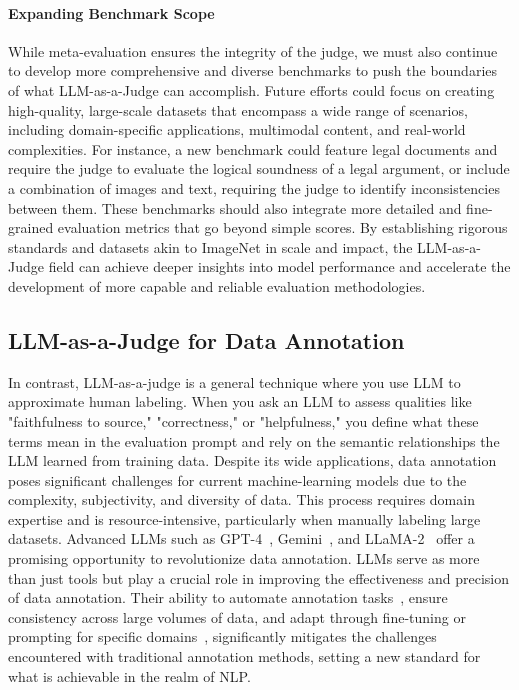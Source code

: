 \documentclass[acmsmall,screen]{acmart}
\begin{document}
\paragraph{\textbf{Expanding Benchmark Scope}}
While meta-evaluation ensures the integrity of the judge, we must also continue to develop more comprehensive and diverse benchmarks to push the boundaries of what LLM-as-a-Judge can accomplish. Future efforts could focus on creating high-quality, large-scale datasets that encompass a wide range of scenarios, including domain-specific applications, multimodal content, and real-world complexities. For instance, a new benchmark could feature legal documents and require the judge to evaluate the logical soundness of a legal argument, or include a combination of images and text, requiring the judge to identify inconsistencies between them. These benchmarks should also integrate more detailed and fine-grained evaluation metrics that go beyond simple scores. By establishing rigorous standards and datasets akin to ImageNet in scale and impact, the LLM-as-a-Judge field can achieve deeper insights into model performance and accelerate the development of more capable and reliable evaluation methodologies.


\subsection{LLM-as-a-Judge for Data Annotation}
{In contrast, LLM-as-a-judge is a general technique where you use LLM to approximate human labeling. When you ask an LLM to assess qualities like "faithfulness to source," "correctness," or "helpfulness," you define what these terms mean in the evaluation prompt and rely on the semantic relationships the LLM learned from training data. }
Despite its wide applications, data annotation poses significant challenges for current machine-learning models due to the complexity, subjectivity, and diversity of data. This process requires domain expertise and is resource-intensive, particularly when manually labeling large datasets. Advanced LLMs such as GPT-4~\cite{openai2023gpt4}, Gemini~\cite{team2023gemini}, and LLaMA-2~\cite{touvron2023llama2} offer a promising opportunity to revolutionize data annotation. LLMs serve as more than just tools but play a crucial role in improving the effectiveness and precision of data annotation. Their ability to automate annotation tasks~\citep{zhang2022automatic}, ensure consistency across large volumes of data, and adapt through fine-tuning or prompting for specific domains~\citep{song2023preference, ma2024leveraginglargelanguagemodels}, significantly mitigates the challenges encountered with traditional annotation methods, setting a new standard for what is achievable in the realm of NLP.
\end{document}
